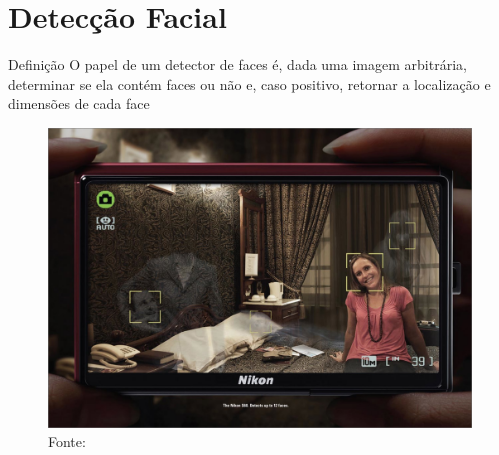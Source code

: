 \section{Detecção Facial}

\begin{frame}{Definição}
O papel de um detector de faces é, dada uma imagem arbitrária, determinar se ela contém faces ou não e, caso positivo, retornar a localização e dimensões de cada face \cite{censtudy}
\end{frame}


\begin{frame}{}
\begin{figure}[htbp]
    \caption{Fonte: }
    \label{fig:nikon}
    \begin{center}
        \includegraphics[width=0.9\linewidth]{imagens/nikon_s60_3.jpg}
    \end{center}
\end{figure}
\end{frame}


